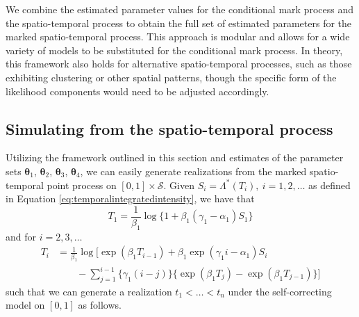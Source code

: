 We combine the estimated parameter values for the conditional mark
process and the spatio-temporal process to obtain the full set of
estimated parameters for the marked spatio-temporal process. This
approach is modular and allows for a wide variety of models to be
substituted for the conditional mark process. In theory, this framework
also holds for alternative spatio-temporal processes, such as those
exhibiting clustering or other spatial patterns, though the specific
form of the likelihood components would need to be adjusted accordingly.

\subsection{Simulating from the spatio-temporal process}\label{simulation}

Utilizing the framework outlined in this section and estimates of the
parameter sets
\(\boldsymbol{\theta}_1\), \(\boldsymbol{\theta}_2\), \(\boldsymbol{\theta}_3\), \(\boldsymbol{\theta}_4\),
we can easily generate realizations from the marked spatio-temporal
point process on \([0, 1] \times \mathscr{S}\). Given
\(S_i = \Lambda^*(T_i), \ i = 1,2,\dots\) as defined in Equation
\eqref{eq:temporalintegratedintensity}, we have that \begin{equation*}
  T_1 = \frac{1}{\beta_1} \log \{ 1 + \beta_1(\gamma_1 - \alpha_1) S_1 \}
\end{equation*} and for \(i = 2, 3, \dots\) \begin{align*}
  T_i &= \frac{1}{\beta_1} \log \biggl [ \exp(\beta_1 T_{i-1}) + \beta_1 \exp(\gamma_1 i - \alpha_1) S_i \\
  &\qquad - \sum_{j=1}^{i-1} \{\gamma_1(i - j)\} \{ \exp(\beta_1 T_j) - \exp(\beta_1 T_{j-1}) \}\biggr ]
\end{align*} such that we can generate a realization \(t_1 < \dots < t_n\)
under the self-correcting model on \([0, 1]\) as follows.

